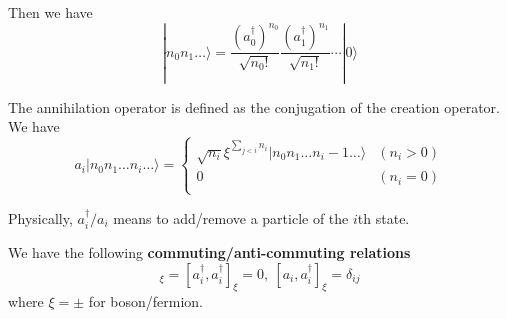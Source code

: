 \documentclass[12pt]{book}
\begin{document}
	Then we have 
	\begin{equation}
		|n_0n_1\dots\rangle=\frac{(a_0^\dagger)^{n_0}}{\sqrt{n_0!}}\frac{(a_1^\dagger)^{n_1}}{\sqrt{n_1!}}\cdots|0\rangle
	\end{equation}
	
	The annihilation operator is defined as the conjugation of the creation operator. We have
	\begin{equation}
		a_i|n_0n_1\dots n_i\dots\rangle=\left\{\begin{array}{cc}
		\sqrt{n_i}\xi^{\sum_{j<i}n_i}|n_0n_1\dots n_i-1\dots\rangle&(n_i>0)\\
		0&(n_i=0)\\
		\end{array}\right.
	\end{equation}
	
	Physically, $a_i^\dagger/a_i$ means to add/remove a particle of the $i$th state.
	
	We have the following \textbf{commuting/anti-commuting relations}
	\begin{equation}
		[a_i,a_i]_\xi=[a_i^\dagger,a_i^\dagger]_\xi=0,\ [a_i,a_i^\dagger]_\xi=\delta_{ij}
	\end{equation}
	where $\xi=\pm$ for boson/fermion.
	
\end{document}
